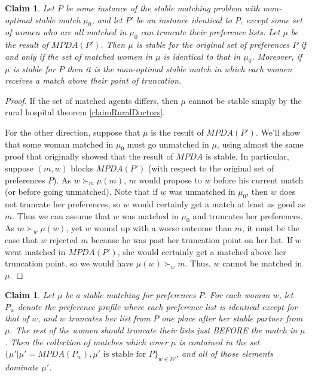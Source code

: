 \documentclass[12pt]{article}
\newcommand{\W}{\mathcal{W}}
\newtheorem{claim}[definition]{Claim}
\begin{document}
  \begin{claim}
    Let $P$ be some instance of the stable matching problem
    with man-optimal stable match $\mu_0$, and let
    $P'$ be an instance identical to $P$, except some set of women
    who are all matched in $\mu_0$ can truncate
    their preference lists. Let $\mu$ be the result of $MPDA(P')$.
    Then $\mu$ is stable for the original set of preferences $P$ if and only if
    the set of matched women in $\mu$ is identical to that in $\mu_0$.
    Moreover, if $\mu$ is stable for $P$ then it is the man-optimal stable match
    in which each women receives a match above their point of truncation.
  \end{claim}
  \begin{proof}
    If the set of matched agents differs, then $\mu$ cannot be stable simply by
    the rural hospital theorem \ref{claimRuralDoctors}.

    For the other direction, suppose that $\mu$ is the result of $MPDA(P')$.
    We'll show that some woman matched in $\mu_0$ must go unmatched in $\mu$,
    using almost the same proof that originally showed that the result of $MPDA$
    is stable.
    In particular, suppose $(m,w)$ blocks $MPDA(P')$ (with respect to the
    original set of preferences $P$).
    As $w\succ_m \mu(m)$, $m$ would propose to $w$ before his current match
    (or before going unmatched).
    Note that if $w$ was unmatched in $\mu_0$, then $w$ does not truncate her
    preferences, so $w$ would certainly get a match at least as good as $m$.
    Thus we can assume that $w$ was matched in $\mu_0$ and truncates her
    preferences.
    As $m\succ_w \mu(w)$, yet $w$ wound up with a worse outcome than $m$,
    it must be the case that $w$ rejected $m$ because he was past her truncation
    point on her list.
    If $w$ went matched in $MPDA(P')$, she would certainly get a matched above
    her truncation point, so we would have $\mu(w)\succ_w m$.
    Thus, $w$ cannot be matched in $\mu$.

  \end{proof}
  \begin{claim}
    Let $\mu$ be a stable matching for preferences $P$.
    For each woman $w$, let $P_w$ denote the preference profile where each
    preference list is identical except for that of $w$,
    and $w$ truncates her list from $P$ one place after her stable partner from
    $\mu$. The rest of the women should truncate their lists
    just BEFORE the match in $\mu$.
    Then the collection of matches which cover $\mu$
    is contained in the set $\{\mu' | \mu' = MPDA(P_w), 
    \mu'\text{ is stable for } P\}_{w\in\W}$, and all of those elements dominate $\mu'$.
  \end{claim}
\end{document}
